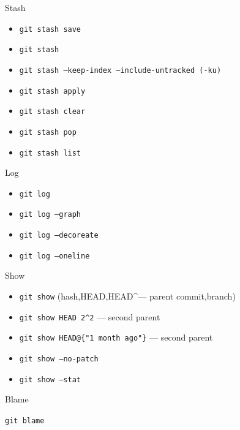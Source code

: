 \documentclass{beamer}
\begin{document}
    \begin{frame}{Stash}
        \begin{itemize}[<+-| alert@+>]
            \item\texttt{git stash save}
            \item\texttt{git stash}
            \item\texttt{git stash --keep-index --include-untracked (-ku)}
            \item\texttt{git stash apply}
            \item\texttt{git stash clear}
            \item\texttt{git stash pop}
            \item\texttt{git stash list}
        \end{itemize}
    \end{frame}

    \begin{frame}{Log}
        \begin{itemize}[<+-| alert@+>]
            \item\texttt{git log}
            \item\texttt{git log --graph}
            \item\texttt{git log --decoreate}
            \item\texttt{git log --oneline}
        \end{itemize}
    \end{frame}

    \begin{frame}{Show}
        \begin{itemize}[<+-| alert@+>]
            \item\texttt{git show} (hash,HEAD,HEAD\textasciicircum --- parent commit,branch)
            \item\texttt{git show HEAD~2\textasciicircum2} --- second parent
            \item\texttt{git show HEAD@\{"1 month ago"\}} --- second parent
            \item\texttt{git show --no-patch}
            \item\texttt{git show --stat}
        \end{itemize}
    \end{frame}

    \begin{frame}{Blame}
        \begin{center}
            \texttt{git blame}
        \end{center}
    \end{frame}
\end{document}
